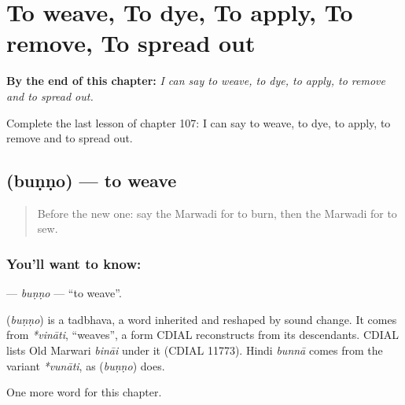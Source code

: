 
\chapter{To weave, To dye, To apply, To remove, To spread out}
\label{ch:mw-to-weave-to-dye-to-apply-to-remove-to-spread-out}

\begin{chapteropening}
\textbf{By the end of this chapter:} \emph{I can say to weave, to dye, to apply, to remove and to spread out.}

Complete the last lesson of chapter 107: I can say to weave, to dye, to apply, to remove and to spread out.
\end{chapteropening}

\section[\texorpdfstring{\mw{बुणणो} (buṇṇo)}{बुणणो (buṇṇo)}]{ (buṇṇo) — to weave}

\label{lesson:MW-C107-bunno}



\begin{quote}
Before the new one: say the Marwadi for to burn, then the Marwadi for to sew.
\end{quote}

\subsection*{You'll want to know: }
\textbf{} — \emph{buṇṇo} — \textquotedblleft{}to weave\textquotedblright{}.

\begin{cousinweb}
\textbf{} (\emph{buṇṇo}) is a tadbhava, a word inherited and reshaped by sound change. It comes from \emph{*vināti}, \textquotedblleft{}weaves\textquotedblright{}, a form CDIAL reconstructs from its descendants. CDIAL lists Old Marwari \emph{bināi} under it (CDIAL 11773). Hindi \emph{bunnā} comes from the variant \emph{*vunāti}, as \textbf{} (\emph{buṇṇo}) does.
\end{cousinweb}

\begin{grammarlens}[title={What you've built}]
One more word for this chapter.
\end{grammarlens}

